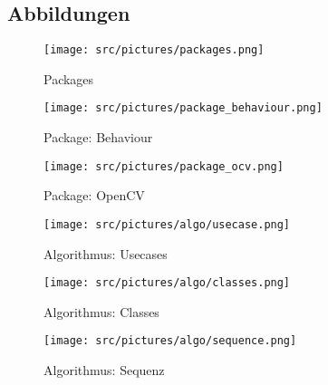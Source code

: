\begin{appendix}

    \chapter{Abbildungen}

        \begin{figure}[ht]
            \centering
            \texttt{[image: src/pictures/packages.png]}
            \caption{Packages}
            \label{img:packages}
        \end{figure}

        \begin{figure}[ht]
            \centering
            \texttt{[image: src/pictures/package\_behaviour.png]}
            \caption{Package: Behaviour}
            \label{img:package:behaviour}
        \end{figure}

        \begin{figure}[ht]
            \centering
            \texttt{[image: src/pictures/package\_ocv.png]}
            \caption{Package: OpenCV}
            \label{img:package:ocv}
        \end{figure}

        \cleardoubleemptypage

        \begin{figure}[ht]
            \centering
            \texttt{[image: src/pictures/algo/usecase.png]}
            \caption{Algorithmus: Usecases}
            \label{img:algo:usecases}
        \end{figure}

        \cleardoubleemptypage

        \begin{figure}[ht]
            \centering
            \texttt{[image: src/pictures/algo/classes.png]}
            \caption{Algorithmus: Classes}
            \label{img:algo:classes}
        \end{figure}

        \cleardoubleemptypage

        \begin{figure}[ht]
            \centering
            \texttt{[image: src/pictures/algo/sequence.png]}
            \caption{Algorithmus: Sequenz}
            \label{img:algo:sequence}
        \end{figure}

\end{appendix}
